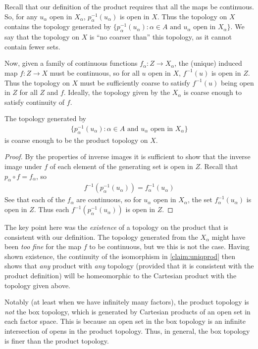       Recall that our definition of the product requires that all the maps be continuous.
      So, for any $u_\alpha$ open in $X_\alpha$, $p_\alpha^{-1}(u_\alpha)$ is open in $X$.
      Thus the topology on $X$ contains the topology generated by $\{p_\alpha^{-1}(u_\alpha):\alpha\in A\text{ and } u_\alpha\text{ open in }X_\alpha\}$.
      We say that the topology on $X$ is ``no coarser than'' this topology, as it cannot contain fewer sets.
      
      Now, given a family of continuous functions $f_\alpha:Z\rightarrow X_\alpha$, the (unique) induced map $f:Z\rightarrow X$ must be continuous, so for all $u$ open in $X$, $f^{-1}(u)$ is open in $Z$.
      Thus the topology on $X$ must be sufficiently coarse to satisfy $f^{-1}(u)$ being open in $Z$ for all $Z$ and $f$.
      Ideally, the topology given by the $X_\alpha$ is coarse enough to satisfy continuity of $f$.

      \begin{thm}
        The topology generated by 
        \begin{align*}
          \{p_\alpha^{-1}(u_\alpha):\alpha\in A\text{ and } u_\alpha\text{ open in }X_\alpha\}
        \end{align*}
        is coarse enough to be the product topology on $X$.
      \end{thm}
      \begin{proof}
        By the properties of inverse images it is sufficient to show that the inverse image under $f$ of each element of the generating set is open in $Z$.
        Recall that $p_\alpha\circ f=f_\alpha$, so 
        \begin{align*}
          f^{-1}(p_\alpha^{-1}(u_\alpha)) = f_\alpha^{-1}(u_\alpha)
        \end{align*}
        See that each of the $f_\alpha$ are continuous, so for $u_\alpha$ open in $X_\alpha$, the set $f_\alpha^{-1}(u_\alpha)$ is open in $Z$.
        Thus each $f^{-1}(p_\alpha^{-1}(u_\alpha))$ is open in $Z$.
      \end{proof}

      \begin{rmk}
        The key point here was the \emph{existence} of a topology on the product that is consistent with our definition. 
        The topology generated from the $X_\alpha$ might have been \emph{too fine} for the map $f$ to be continuous, but we this is not the case.
        Having shown existence, the continuity of the isomorphism in \cref{claim:uniqprod} then shows that \emph{any} product with \emph{any}  topology (provided that it is consistent with the product definition) will be homeomorphic to the Cartesian product with the topology given above.

        Notably (at least when we have infinitely many factors), the product topology is \emph{not} the box topology, which is generated by Cartesian products of an open set in each factor space.
        This is because an open set in the box topology is an infinite intersection of opens in the product topology.
        Thus, in general, the box topology is finer than the product topology.
      \end{rmk}

